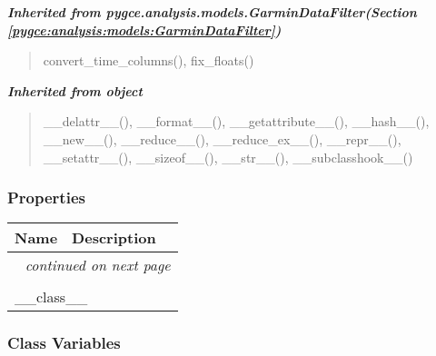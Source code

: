 \large{\textbf{\textit{Inherited from pygce.analysis.models.GarminDataFilter\textit{(Section \ref{pygce:analysis:models:GarminDataFilter})}}}}

\begin{quote}
convert\_time\_columns(), fix\_floats()
\end{quote}

\large{\textbf{\textit{Inherited from object}}}

\begin{quote}
\_\_delattr\_\_(), \_\_format\_\_(), \_\_getattribute\_\_(), \_\_hash\_\_(), \_\_new\_\_(), \_\_reduce\_\_(), \_\_reduce\_ex\_\_(), \_\_repr\_\_(), \_\_setattr\_\_(), \_\_sizeof\_\_(), \_\_str\_\_(), \_\_subclasshook\_\_()
\end{quote}


  \subsubsection{Properties}

    \vspace{-1cm}
\hspace{\varindent}\begin{longtable}{|p{\varnamewidth}|p{\vardescrwidth}|l}
\cline{1-2}
\cline{1-2} \centering \textbf{Name} & \centering \textbf{Description}& \\
\cline{1-2}
\endhead\cline{1-2}\multicolumn{3}{r}{\small\textit{continued on next page}}\\\endfoot\cline{1-2}
\endlastfoot\multicolumn{2}{|l|}{\textit{Inherited from object}}\\
\multicolumn{2}{|p{\varwidth}|}{\raggedright \_\_class\_\_}\\
\cline{1-2}
\end{longtable}



  \subsubsection{Class Variables}

